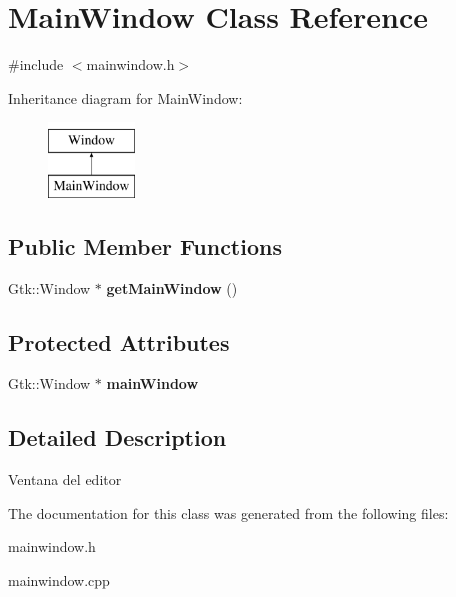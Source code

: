 \hypertarget{classMainWindow}{\section{Main\-Window Class Reference}
\label{classMainWindow}
}


{\ttfamily \#include $<$mainwindow.\-h$>$}

Inheritance diagram for Main\-Window\-:\begin{figure}[H]
\begin{center}
\leavevmode
\includegraphics[height=2.000000cm]{classMainWindow}
\end{center}
\end{figure}
\subsection*{Public Member Functions}
\begin{DoxyCompactItemize}
\item 
\hypertarget{classMainWindow_ab5ef58f67a537ebff6a0263e7e2093fb}{Gtk\-::\-Window $\ast$ {\bfseries get\-Main\-Window} ()}\label{classMainWindow_ab5ef58f67a537ebff6a0263e7e2093fb}

\end{DoxyCompactItemize}
\subsection*{Protected Attributes}
\begin{DoxyCompactItemize}
\item 
\hypertarget{classMainWindow_a7e7053859f651b1cb784497418f9130e}{Gtk\-::\-Window $\ast$ {\bfseries main\-Window}}\label{classMainWindow_a7e7053859f651b1cb784497418f9130e}

\end{DoxyCompactItemize}


\subsection{Detailed Description}
Ventana del editor 

The documentation for this class was generated from the following files\-:\begin{DoxyCompactItemize}
\item 
mainwindow.\-h\item 
mainwindow.\-cpp\end{DoxyCompactItemize}
